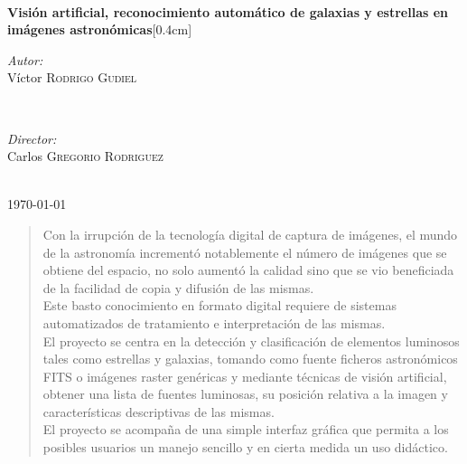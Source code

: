 \begin{titlepage}
		\HRule \\[0.2cm]
		{ \huge \bfseries Visión artificial, reconocimiento automático de galaxias y estrellas en imágenes astronómicas}[0.4cm] %
		\HRule \\[0.4cm]
		
		
		\begin{minipage}{0.4\textwidth}
			\begin{flushleft} \large
				\emph{Autor:}\\
				Víctor \textsc{Rodrigo Gudiel} %
			\end{flushleft}
		\end{minipage}
		~
		\begin{minipage}{0.4\textwidth}
			\begin{flushright} \large
				\emph{Director:} \\
				Carlos  \textsc{Gregorio Rodriguez} %
			\end{flushright}
		\end{minipage}\\[0.4cm] 
		

		
			
			{\large \today}\\[2cm] %
		\vfill %
		
	\end{titlepage}
	
	\begin{abstract}
		Con la irrupción de la tecnología digital de captura de imágenes, el mundo de la astronomía incrementó notablemente el número de imágenes que se obtiene del espacio, no solo aumentó la calidad sino que se vio beneficiada de la facilidad de copia y difusión de las mismas.\\
		Este basto conocimiento en formato digital requiere de sistemas automatizados de tratamiento e interpretación de las mismas.\\
		El proyecto se centra en la detección y clasificación de elementos luminosos tales como estrellas y galaxias, tomando como fuente ficheros astronómicos FITS o imágenes raster genéricas y mediante técnicas de visión artificial, obtener una lista de fuentes luminosas, su posición relativa a la imagen y características descriptivas de las mismas.\\
		El proyecto se acompaña de una simple interfaz gráfica que permita a los posibles usuarios un manejo sencillo y en cierta medida un uso didáctico.\\
	\end{abstract}
	
